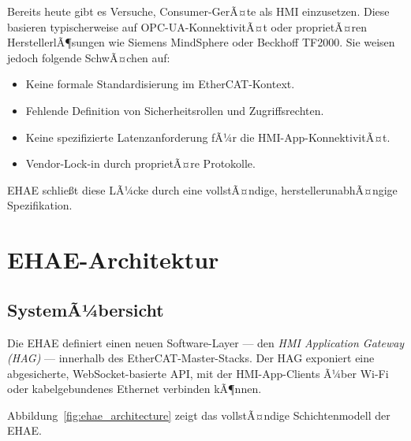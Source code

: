 ﻿\documentclass[12pt,a4paper]{article}
\begin{document}
Bereits heute gibt es Versuche, Consumer-GerÃ¤te als HMI einzusetzen. Diese basieren
typischerweise auf OPC-UA-KonnektivitÃ¤t oder proprietÃ¤ren HerstellerlÃ¶sungen wie
Siemens MindSphere oder Beckhoff TF2000. Sie weisen jedoch folgende SchwÃ¤chen auf:

\begin{itemize}[leftmargin=2em]
  \item Keine formale Standardisierung im EtherCAT-Kontext.
  \item Fehlende Definition von Sicherheitsrollen und Zugriffsrechten.
  \item Keine spezifizierte Latenzanforderung fÃ¼r die HMI-App-KonnektivitÃ¤t.
  \item Vendor-Lock-in durch proprietÃ¤re Protokolle.
\end{itemize}

EHAE schlie\ss{}t diese LÃ¼cke durch eine vollstÃ¤ndige, herstellerunabhÃ¤ngige Spezifikation.

\section{EHAE-Architektur}
\label{sec:ehae}

\subsection{SystemÃ¼bersicht}

Die EHAE definiert einen neuen Software-Layer --- den \emph{HMI Application Gateway
(HAG)} --- innerhalb des EtherCAT-Master-Stacks. Der HAG exponiert eine abgesicherte,
WebSocket-basierte API, mit der HMI-App-Clients Ã¼ber Wi-Fi oder kabelgebundenes Ethernet
verbinden kÃ¶nnen.

Abbildung~\ref{fig:ehae_architecture} zeigt das vollstÃ¤ndige Schichtenmodell der EHAE.
\end{document}

